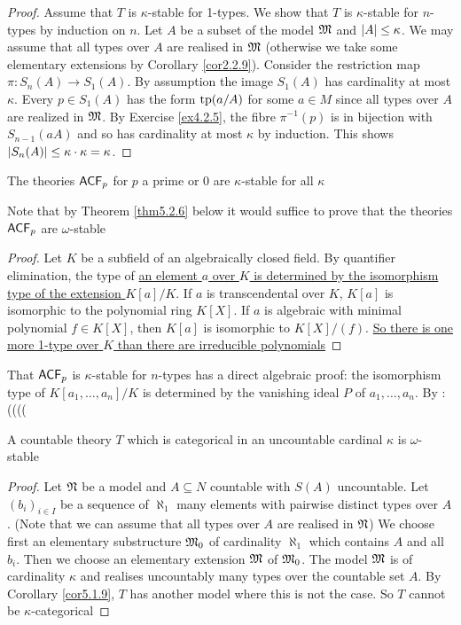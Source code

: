 \documentclass[11pt]{article}
\begin{document}
\begin{proof}
Assume that \(T\) is \(\kappa\)-stable for 1-types. We show that \(T\) is \(\kappa\)-stable for \(n\)-types by
induction on \(n\). Let \(A\) be a subset of the model \(\mathfrak{M}\) and \(\abs{A}\le\kappa\). We may assume
that all types over \(A\) are realised in \(\mathfrak{M}\) (otherwise we take some elementary extensions by
Corollary \ref{cor2.2.9}). Consider the restriction map \(\pi:S_n(A)\to S_1(A)\). By assumption the
image \(S_1(A)\) has cardinality at most \(\kappa\).
Every \(p\in S_1(A)\) has the form \(\operatorname{tp}(a/A)\) for some \(a\in M\) since all types over \(A\) are
realized in \(\mathfrak{M}\). By Exercise \ref{ex4.2.5}, the fibre \(\pi^{-1}(p)\) is in bijection
with \(S_{n-1}(aA)\) and so has cardinality at most \(\kappa\) by induction. This shows \(\abs{S_n(A)}\le\kappa\cdot\kappa=\kappa\).
\end{proof}

\begin{examplle}
The theories \(\textsf{ACF}_p\) for \(p\) a prime or 0 are \(\kappa\)-stable for all \(\kappa\)
\end{examplle}

Note that by Theorem \ref{thm5.2.6} below it would suffice to prove that the theories \(\textsf{ACF}_p\)
are \(\omega\)-stable

\begin{proof}
\label{Problem1}
Let \(K\) be a subfield of an algebraically closed field. By quantifier elimination, the type of
\uline{an element \(a\) over \(K\) is determined by the isomorphism type of the extension \(K[a]/K\)}.
If \(a\) is transcendental over \(K\), \(K[a]\) is isomorphic to the polynomial ring \(K[X]\).
If \(a\) is algebraic with minimal polynomial \(f\in K[X]\), then \(K[a]\) is isomorphic
to \(K[X]/(f)\). \uline{So there is one more 1-type over \(K\) than there are irreducible polynomials}
\end{proof}

That \(\textsf{ACF}_p\) is \(\kappa\)-stable for \(n\)-types has a direct algebraic proof: the isomorphism type
of \(K[a_1,\dots,a_n]/K\) is determined by the vanishing ideal \(P\) of \(a_1,\dots,a_n\). By :((((

\begin{theorem}[]
\label{thm5.2.4}
A countable theory \(T\) which is categorical in an uncountable cardinal \(\kappa\) is \(\omega\)-stable
\end{theorem}

\begin{proof}
Let \(\mathfrak{N}\) be a model and \(A\subseteq N\) countable with \(S(A)\) uncountable. Let \((b_i)_{i\in I}\) be a
sequence of \(\aleph_1\) many elements with pairwise distinct types over \(A\). (Note that we can
assume that all types over \(A\) are realised in \(\mathfrak{N}\)) We choose first an elementary
substructure \(\mathfrak{M}_0\) of cardinality \(\aleph_1\) which contains \(A\) and all \(b_i\). Then we choose an
elementary extension \(\mathfrak{M}\) of \(\mathfrak{M}_0\). The model \(\mathfrak{M}\) is of cardinality \(\kappa\) and realises
uncountably many types over the countable set \(A\). By Corollary \ref{cor5.1.9}, \(T\) has another
model where this is not the case. So \(T\) cannot be \(\kappa\)-categorical
\end{proof}
\end{document}
